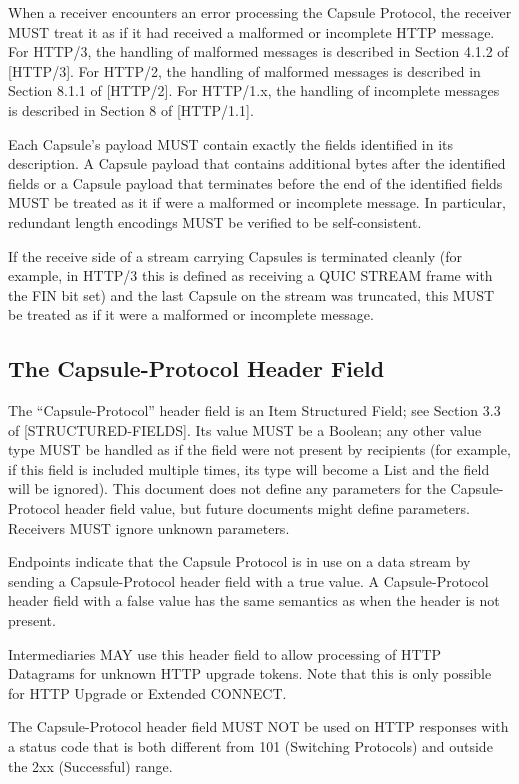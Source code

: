 \documentclass{article}
\begin{document}
When a receiver encounters an error processing the Capsule Protocol,
the receiver MUST treat it as if it had received a malformed or
incomplete HTTP message.  For HTTP/3, the handling of malformed
messages is described in Section 4.1.2 of [HTTP/3].  For HTTP/2, the
handling of malformed messages is described in Section 8.1.1 of
[HTTP/2].  For HTTP/1.x, the handling of incomplete messages is
described in Section 8 of [HTTP/1.1].

Each Capsule's payload MUST contain exactly the fields identified in
its description.  A Capsule payload that contains additional bytes
after the identified fields or a Capsule payload that terminates
before the end of the identified fields MUST be treated as it if were
a malformed or incomplete message.  In particular, redundant length
encodings MUST be verified to be self-consistent.

If the receive side of a stream carrying Capsules is terminated
cleanly (for example, in HTTP/3 this is defined as receiving a QUIC
STREAM frame with the FIN bit set) and the last Capsule on the stream
was truncated, this MUST be treated as if it were a malformed or
incomplete message.

\subsection{The Capsule-Protocol Header Field}

The ``Capsule-Protocol'' header field is an Item Structured Field; see
Section 3.3 of [STRUCTURED-FIELDS].  Its value MUST be a Boolean; any
other value type MUST be handled as if the field were not present by
recipients (for example, if this field is included multiple times,
its type will become a List and the field will be ignored).  This
document does not define any parameters for the Capsule-Protocol
header field value, but future documents might define parameters.
Receivers MUST ignore unknown parameters.

Endpoints indicate that the Capsule Protocol is in use on a data
stream by sending a Capsule-Protocol header field with a true value.
A Capsule-Protocol header field with a false value has the same
semantics as when the header is not present.

Intermediaries MAY use this header field to allow processing of HTTP
Datagrams for unknown HTTP upgrade tokens.  Note that this is only
possible for HTTP Upgrade or Extended CONNECT.

The Capsule-Protocol header field MUST NOT be used on HTTP responses
with a status code that is both different from 101 (Switching
Protocols) and outside the 2xx (Successful) range.
\end{document}
